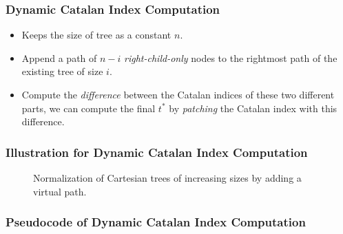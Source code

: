 \begin{frame}
	\frametitle{Dynamic Catalan Index Computation}
	\begin{itemize}
		\setlength\itemsep{1em}
	 	\item 
	 		Keeps the size of tree as a constant $n$.
	 	\item
	 		Append a path of $n-i$ {\em right-child-only} nodes to the
			rightmost path of the existing tree of size $i$.
		\item
			Compute the {\em difference} between the Catalan indices of
			these two different parts, we can compute the final $t^*$ by
			{\em patching} the Catalan index with this difference.
	\end{itemize}
\end{frame}

\begin{frame}
	\frametitle{Illustration for Dynamic Catalan Index Computation}
	\begin{center}
		\scalebox{0.8} { \begin{minipage}{1.3\textwidth}
			\begin{figure}[!thb]
			  \centering {}  
			  \caption{Normalization of Cartesian trees of increasing sizes by
			    adding a virtual path.}
			  \label{fig:cartesianEncoding}
			\end{figure}
			\end{minipage}
		}
	\end{center}
\end{frame}

\begin{frame}
	\frametitle{Pseudocode of Dynamic Catalan Index Computation}
	\begin{center}
		\scalebox{0.7} { \begin{minipage}{\textwidth}
			
			\end{minipage}
		}
	\end{center}
\end{frame}


